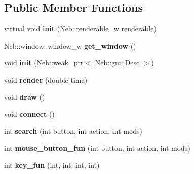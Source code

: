 \subsection*{\-Public \-Member \-Functions}
\begin{DoxyCompactItemize}
\item 
\hypertarget{classNeb_1_1gui_1_1layout_a62b6d681dfea9f0dc35e6284f0daacd9}{virtual void {\bfseries init} (\hyperlink{classNeb_1_1weak__ptr}{\-Neb\-::renderable\-\_\-w} \hyperlink{classNeb_1_1renderable}{renderable})}\label{classNeb_1_1gui_1_1layout_a62b6d681dfea9f0dc35e6284f0daacd9}

\item 
\hypertarget{classNeb_1_1gui_1_1layout_a524c01b6af0320f6c89eec7b2d8a7409}{\-Neb\-::window\-::window\-\_\-w {\bfseries get\-\_\-window} ()}\label{classNeb_1_1gui_1_1layout_a524c01b6af0320f6c89eec7b2d8a7409}

\item 
\hypertarget{classNeb_1_1gui_1_1layout_af415dbb46b787503ce59ea2633a120d5}{void {\bfseries init} (\hyperlink{classNeb_1_1weak__ptr}{\-Neb\-::weak\-\_\-ptr}$<$ \hyperlink{classNeb_1_1gui_1_1Desc}{\-Neb\-::gui\-::\-Desc} $>$)}\label{classNeb_1_1gui_1_1layout_af415dbb46b787503ce59ea2633a120d5}

\item 
\hypertarget{classNeb_1_1gui_1_1layout_a74db00418c895eb927fb677d62840da2}{void {\bfseries render} (double time)}\label{classNeb_1_1gui_1_1layout_a74db00418c895eb927fb677d62840da2}

\item 
\hypertarget{classNeb_1_1gui_1_1layout_a9847407c316541a74dbfc9dc5bfbcca5}{void {\bfseries draw} ()}\label{classNeb_1_1gui_1_1layout_a9847407c316541a74dbfc9dc5bfbcca5}

\item 
\hypertarget{classNeb_1_1gui_1_1layout_af5c47df62d77066d3bb80e0387f1955a}{void {\bfseries connect} ()}\label{classNeb_1_1gui_1_1layout_af5c47df62d77066d3bb80e0387f1955a}

\item 
\hypertarget{classNeb_1_1gui_1_1layout_a73ec1453db20d46c72ccf0687499fce0}{int {\bfseries search} (int button, int action, int mods)}\label{classNeb_1_1gui_1_1layout_a73ec1453db20d46c72ccf0687499fce0}

\item 
\hypertarget{classNeb_1_1gui_1_1layout_aeb830e05ab8d72374c49c3d9df4470f8}{int {\bfseries mouse\-\_\-button\-\_\-fun} (int button, int action, int mods)}\label{classNeb_1_1gui_1_1layout_aeb830e05ab8d72374c49c3d9df4470f8}

\item 
\hypertarget{classNeb_1_1gui_1_1layout_a7cc59f1cda6205cb81cfa08aab5b9a6e}{int {\bfseries key\-\_\-fun} (int, int, int, int)}\label{classNeb_1_1gui_1_1layout_a7cc59f1cda6205cb81cfa08aab5b9a6e}

\end{DoxyCompactItemize}
